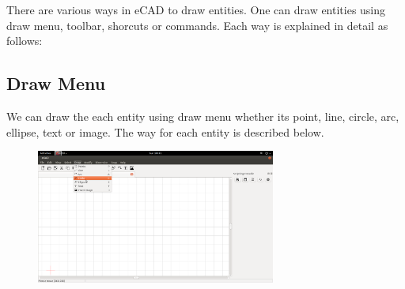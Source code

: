 There are various ways in eCAD to draw entities. One can draw entities using draw menu, toolbar, shorcuts or commands. Each way is explained in detail as follows:
\subsection{Draw Menu}
We can draw the each entity using draw menu whether its point, line, circle, arc, ellipse, text or image. The way for each entity is described below.
\begin{figure}[h!]
\centering
\includegraphics[width=0.7\textwidth]{images/drawmenu.png}\\
\end{figure}
